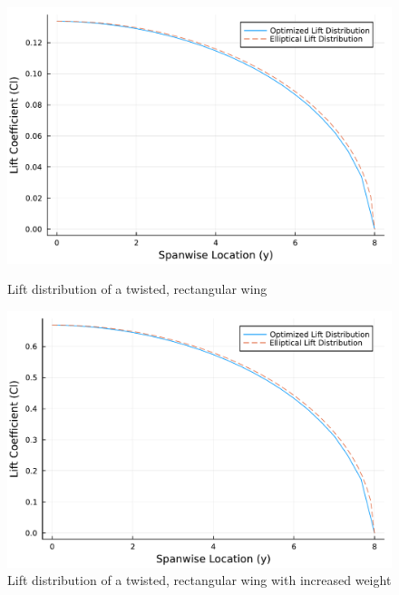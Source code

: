\documentclass{article}
\begin{document}
\begin{figure}[h]
    \centering
\begin{minipage}[b]{0.45\textwidth}
\centering
\includegraphics[width=\textwidth]{Lift_Distribution_along_the_Span_Twist_Optimization.pdf}
\caption{Lift distribution of a twisted, rectangular wing}
\label{fig:Optimized Twist Small Load}
\end{minipage}
\begin{minipage}[b]{0.45\textwidth}
\centering
\includegraphics[width=\textwidth]{Lift_Distribution_along_the_Span_Twist_Optimization_increased_lift.pdf}
\caption{Lift distribution of a twisted, rectangular wing with increased weight}
\label{fig:Optimized Twist Large Load}
\end{minipage}
\end{figure}
\end{document}
